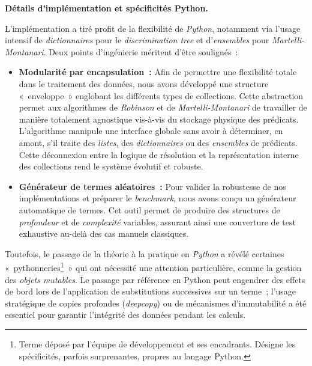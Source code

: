 \documentclass[11pt]{article}
\newenvironment{paraph}[1]{%
  \medskip
  \noindent\textbf{#1.}\quad

  \vspace{0.2cm}
}{%
  \medskip
}
\begin{document}
\begin{paraph}{Détails d'implémentation et spécificités Python}
    L'implémentation a tiré profit de la flexibilité de \textit{Python}, notamment via 
    l'usage intensif de \textit{dictionnaires} pour le \textit{discrimination tree} 
    et d'\textit{ensembles} pour \textit{Martelli-Montanari}. Deux points d'ingénierie 
    méritent d'être soulignés~:
    \begin{itemize}
        \item \textbf{Modularité par encapsulation~:} Afin de permettre une flexibilité 
        totale dans le traitement des données, nous avons développé une structure 
        «~enveloppe~» englobant les différents types de collections. Cette abstraction 
        permet aux algorithmes de \textit{Robinson} et de \textit{Martelli-Montanari} de travailler de 
        manière totalement agnostique vis-à-vis du stockage physique des prédicats. 
        L'algorithme manipule une interface globale sans avoir à déterminer, en amont, 
        s'il traite des \textit{listes}, des \textit{dictionnaires} ou des 
        \textit{ensembles} de prédicats. Cette déconnexion entre la logique de 
        résolution et la représentation interne des collections rend le système 
        évolutif et robuste.
        \item \textbf{Générateur de termes aléatoires~:} Pour valider la robustesse 
        de nos implémentations et préparer le \textit{benchmark}, nous avons 
        conçu un générateur automatique de termes. Cet outil permet de produire 
        des structures de \textit{profondeur} et de \textit{complexité} variables, 
        assurant ainsi une couverture de test exhaustive au-delà des cas 
        manuels classiques.
    \end{itemize}

    Toutefois, le passage de la théorie à la pratique en \textit{Python} a révélé 
    certaines «~pythonneries\footnote{Terme déposé par l'équipe 
    de développement et ses encadrants. Désigne les spécificités, 
    parfois surprenantes, propres au langage Python.}~» qui ont nécessité 
    une attention particulière, comme la gestion des \textit{objets mutables}. 
    Le passage par référence en Python peut engendrer des effets de bord lors 
    de l'application de substitutions successives sur un terme~; l'usage 
    stratégique de copies profondes (\textit{deepcopy}) ou de mécanismes 
    d'immutabilité a été essentiel pour garantir l'intégrité des données 
    pendant les calculs.
\end{paraph}
\end{document}
